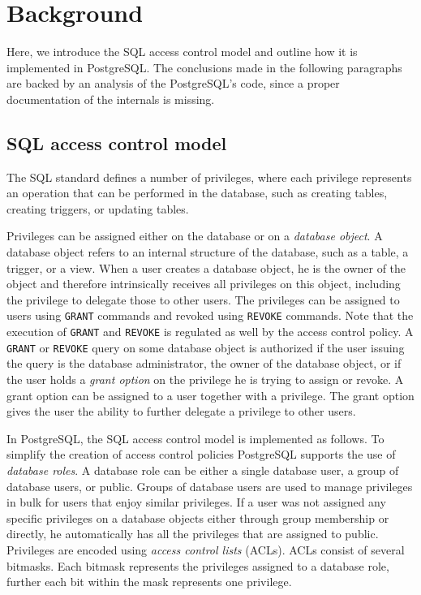 \section{Background}

Here, we introduce the SQL access control model and outline how it is implemented in PostgreSQL.
%
The conclusions made in the following paragraphs are backed by an analysis of the  PostgreSQL's code, since a proper documentation of the internals is missing.

\subsection{SQL access control model}

The SQL standard defines a number of privileges, where each privilege represents an operation that can be performed in the database, such as creating tables, creating triggers, or updating tables.

Privileges can be assigned either on the database or on a \emph{database object}. 
%
A database object refers to an internal structure of the database, such as a table, a trigger, or a view. 
%
When a user creates a database object, he is the owner of the object and therefore intrinsically receives all privileges on this object, including the privilege to delegate those to other users.
%
The privileges can be assigned to users using \texttt{GRANT} commands and revoked using \texttt{REVOKE} commands.
%
Note that the execution of  \texttt{GRANT} and \texttt{REVOKE} is regulated as well by the access control policy. 
%
A \texttt{GRANT} or \texttt{REVOKE} query on some database object is authorized if the user issuing the query is the database administrator, the owner of the database object, or if the user holds a \emph{grant option} on the privilege he is trying to assign or revoke. 
%
A grant option can be assigned to a user together with a privilege.
%
The grant option gives the user the ability to further delegate a privilege to other users.

In PostgreSQL, the SQL access control model is implemented as follows.
%
To simplify the creation of access control policies PostgreSQL supports the use of \emph{database roles}.
%
A database role can be either a single database user, a group of database users, or public. 
%
Groups of database users are used to manage privileges in bulk for users that enjoy similar privileges.
%
If a user was not assigned any specific privileges on a database objects either through group membership or directly, he automatically has all the privileges that are assigned to public.
%
Privileges are encoded using \emph{access control lists} (ACLs).
%
ACLs consist of several bitmasks.
%
Each bitmask represents the privileges assigned to a database role, further each bit within the mask represents one privilege.
%

